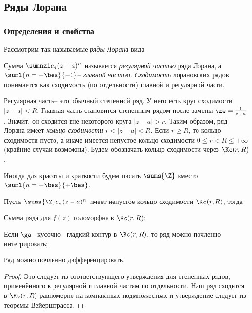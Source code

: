 \documentclass[a4paper]{article}
\begin{document}
\subsection{Ряды Лорана}

\subsubsection{Определения и свойства}

Рассмотрим так называемые \emph{ряды Лорана} вида

\begin{df}
Сумма $\sumnzi c_n(z-a)^n$ называется \emph{регулярной частью} ряда Лорана, а $\suml{n=-\bes}{-1}$--
\emph{главной частью}. \emph{Сходимость} лорановских рядов понимается как сходимость (по отдельности)
главной и регулярной части.
\end{df}

Регулярная часть-- это обычный степенной ряд. У него есть круг сходимости $|z-a| < R$.
Главная часть становится степенным рядом после замены $\ze = \frac{1}{z-a}$. Значит,
он сходится вне некоторого круга $|z-a| > r$. Таким образом, ряд Лорана
имеет \emph{кольцо сходимости} $r < |z-a| < R$. Если $r\ge R$, то кольцо сходимости пусто, а иначе
имеется непустое кольцо сходимости $0\le r < R \le +\infty$ (крайние случаи возможны).
Будем обозначать кольцо сходимости через $\Kc(r,R)$.

Иногда для красоты и краткости будем писать $\sums{\Z}$ вместо $\suml{n=-\bes}{+\bes}$.

\begin{stm}
Пусть $\sums{\Z}c_n(z-a)^n$ имеет непустое кольцо сходимости $\Kc(r,R)$, тогда
\begin{nums}{-2}
\item Сумма ряда для $f(z)$ голоморфна в $\Kc(r,R)$;
\item Если $\ga$-- кусочно-- гладкий контур в $\Kc(r,R)$, то ряд можно почленно интегрировать;
\item Ряд можно почленно дифференцировать.
\end{nums}
\end{stm}
\begin{proof}
Это следует из соответствующего утверждения для степенных рядов, применённого к регулярной и
главной частям по отдельности. Наш ряд сходится в $\Kc(r,R)$ равномерно на компактных
подмножествах и утверждение следует из теоремы Вейерштрасса.
\end{proof}
\end{document}
